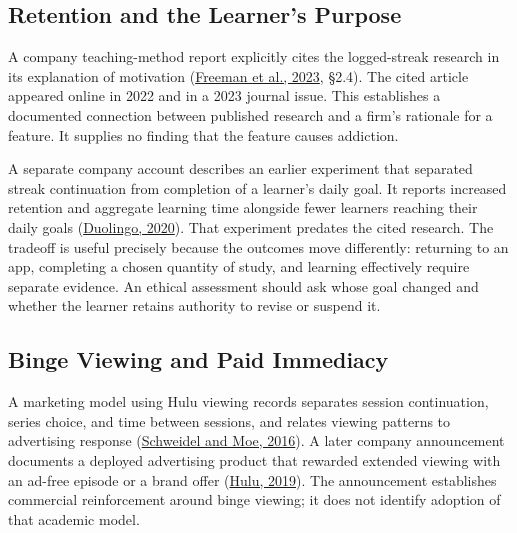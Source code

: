\noindent \hypertarget{M09-retention-and-the-learners-purpose}{%
\subsection{Retention and the Learner's
Purpose}\label{M09-retention-and-the-learners-purpose}}

\noindent \noindent A company teaching-method report explicitly cites the
logged-streak research in its explanation of motivation
(\href{https://duolingo-papers.s3.amazonaws.com/reports/Duolingo_whitepaper_duolingo_method_2023.pdf}{Freeman
et al., 2023}, §2.4). The cited article appeared online in 2022 and in a
2023 journal issue. This establishes a documented connection between
published research and a firm's rationale for a feature. It supplies no
finding that the feature causes addiction.

A separate company account describes an earlier experiment that
separated streak continuation from completion of a learner's daily goal.
It reports increased retention and aggregate learning time alongside
fewer learners reaching their daily goals
(\href{https://blog.duolingo.com/improving-the-streak/}{Duolingo,
2020}). That experiment predates the cited research. The tradeoff is
useful precisely because the outcomes move differently: returning to an
app, completing a chosen quantity of study, and learning effectively
require separate evidence. An ethical assessment should ask whose goal
changed and whether the learner retains authority to revise or suspend
it.

\hypertarget{M09-binge-viewing-and-paid-immediacy}{%
\subsection{Binge Viewing and Paid
Immediacy}\label{M09-binge-viewing-and-paid-immediacy}}

\noindent \noindent A marketing model using Hulu viewing records separates session
continuation, series choice, and time between sessions, and relates
viewing patterns to advertising response
(\href{https://doi.org/10.1509/jm.15.0258}{Schweidel and Moe, 2016}). A
later company announcement documents a deployed advertising product that
rewarded extended viewing with an ad-free episode or a brand offer
(\href{https://press.hulu.com/pressrelease/hulu-launches-new-ad-experience-designed-to-connect-brands-with-binge-watchers/}{Hulu,
2019}). The announcement establishes commercial reinforcement around
binge viewing; it does not identify adoption of that academic model.

